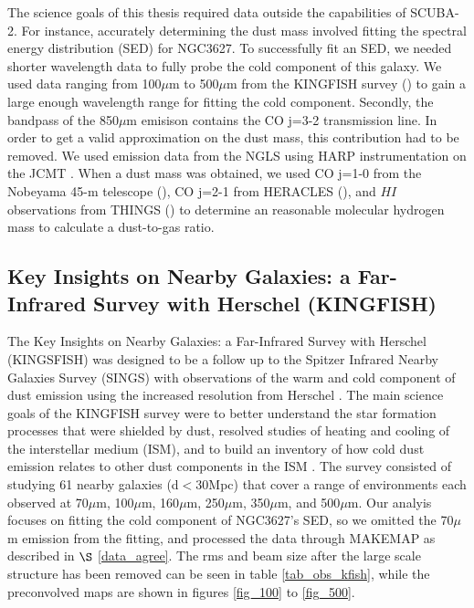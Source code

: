 The science goals of this thesis required data outside the capabilities of SCUBA-2.  For instance, accurately determining the dust mass involved fitting the spectral energy distribution (SED) for NGC3627.  To successfully fit an SED, we needed shorter wavelength data to fully probe the cold component of this galaxy. We used data ranging from 100$\mu$m to 500$\mu$m from the KINGFISH survey (\citep{kennicutt2011}) to gain a large enough wavelength range for fitting the cold component.  Secondly, the bandpass of the 850$\mu$m emisison contains the CO j=3-2 transmission line.  In order to get a valid approximation on the dust mass, this contribution had to be removed.  We used emission data from the NGLS using HARP instrumentation on the JCMT \citep{wilson2012}.  When a dust mass was obtained, we used CO j=1-0 from the Nobeyama 45-m telescope (\citep{kuno2007}), CO j=2-1 from HERACLES (\citep{leroy2009}), and $HI$ observations from THINGS (\citep{walter2008}) to determine an reasonable molecular hydrogen mass to calculate a dust-to-gas ratio.

\subsection{Key Insights on Nearby Galaxies: a Far-Infrared Survey with Herschel (KINGFISH)}


The Key Insights on Nearby Galaxies: a Far-Infrared Survey with Herschel (KINGSFISH) was designed to be a follow up to the Spitzer Infrared Nearby Galaxies Survey (SINGS) \citep{kennicutt2003} with observations of the warm and cold component of dust emission using the increased resolution from Herschel \citep{kennicutt2011}.  The main science goals of the KINGFISH survey were to better understand the star formation processes that were shielded by dust, resolved studies of heating and cooling of the interstellar medium (ISM), and to build an inventory of how cold dust emission relates to other dust components in the ISM \citep{kennicutt2011}.  The survey consisted of studying 61 nearby galaxies (d$<$30Mpc) that cover a range of environments each observed at 70$\mu$m, 100$\mu$m, 160$\mu$m, 250$\mu$m, 350$\mu$m, and 500$\mu$m.  Our analyis focuses on fitting the cold component of NGC3627's SED, so we omitted the 70$\mu$m emission from the fitting, and processed the data through MAKEMAP as described in $\S$ \ref{data_agree}.  The rms and beam size after the large scale structure has been removed can be seen in table \ref{tab_obs_kfish}, while the preconvolved maps are shown in figures \ref{fig_100} to \ref{fig_500}.

